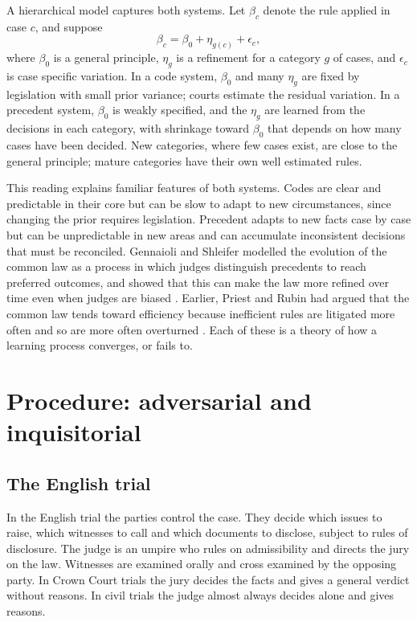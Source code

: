 A hierarchical model captures both systems. Let $\beta_c$ denote the rule applied in case $c$, and suppose
\begin{equation}
\beta_c = \beta_0 + \eta_{g(c)} + \epsilon_c,
\end{equation}
where $\beta_0$ is a general principle, $\eta_g$ is a refinement for a category $g$ of cases, and $\epsilon_c$ is case specific variation. In a code system, $\beta_0$ and many $\eta_g$ are fixed by legislation with small prior variance; courts estimate the residual variation. In a precedent system, $\beta_0$ is weakly specified, and the $\eta_g$ are learned from the decisions in each category, with shrinkage toward $\beta_0$ that depends on how many cases have been decided. New categories, where few cases exist, are close to the general principle; mature categories have their own well estimated rules.

This reading explains familiar features of both systems. Codes are clear and predictable in their core but can be slow to adapt to new circumstances, since changing the prior requires legislation. Precedent adapts to new facts case by case but can be unpredictable in new areas and can accumulate inconsistent decisions that must be reconciled. Gennaioli and Shleifer modelled the evolution of the common law as a process in which judges distinguish precedents to reach preferred outcomes, and showed that this can make the law more refined over time even when judges are biased \citep{gennaioli2007}. Earlier, Priest and Rubin had argued that the common law tends toward efficiency because inefficient rules are litigated more often and so are more often overturned \citep{priest1977,rubin1977}. Each of these is a theory of how a learning process converges, or fails to.

\section{Procedure: adversarial and inquisitorial}

\subsection{The English trial}

In the English trial the parties control the case. They decide which issues to raise, which witnesses to call and which documents to disclose, subject to rules of disclosure. The judge is an umpire who rules on admissibility and directs the jury on the law. Witnesses are examined orally and cross examined by the opposing party. In Crown Court trials the jury decides the facts and gives a general verdict without reasons. In civil trials the judge almost always decides alone and gives reasons.

